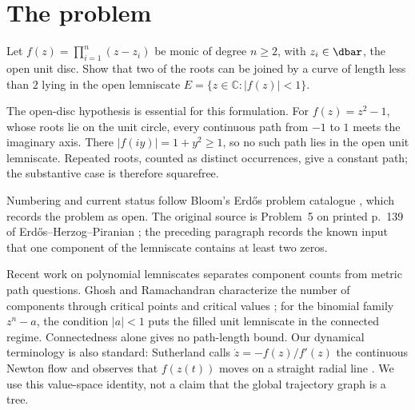 \section{The problem}\label{sec:problem}

\begin{problem}[Erd\H{o}s \#1041]\label{res:problem}
Let $f(z)=\prod_{i=1}^{n}(z-z_i)$ be monic of degree $n\ge2$, with
$z_i\in\dbar$, the open unit disc.  Show that two of the roots can be joined by a curve of length less than
$2$ lying in the open lemniscate $E=\{z\in\mathbb{C}:|f(z)|<1\}$.
\end{problem}

The open-disc hypothesis is essential for this formulation.  For
$f(z)=z^2-1$, whose roots lie on the unit circle, every continuous path from
$-1$ to $1$ meets the imaginary axis.  There $|f(iy)|=1+y^2\ge1$, so no
such path lies in the open unit lemniscate.  Repeated roots, counted as distinct
occurrences, give a constant path; the substantive case is therefore
squarefree.

\noindent Numbering and current status follow Bloom's Erd\H{o}s problem
catalogue \cite{bloom}, which records the problem as open.
The original source is Problem~5 on printed p.~139 of
Erd\H{o}s--Herzog--Piranian \cite[p.~139]{ehp1958}; the preceding paragraph records the
known input that one component of the lemniscate contains at least two zeros.

Recent work on polynomial lemniscates separates component counts from metric
path questions. Ghosh and Ramachandran characterize the number of components
through critical points and critical values \cite[Lemma~7]{ghosh2023}; for the
binomial family $z^n-a$, the condition $|a|<1$ puts the filled unit lemniscate
in the connected regime. Connectedness alone gives no path-length bound.
Our dynamical terminology is also standard: Sutherland calls
$\dot z=-f(z)/f'(z)$ the continuous Newton flow and observes that $f(z(t))$
moves on a straight radial line \cite[p.~42]{sutherland1992}. We use this
value-space identity, not a claim that the global trajectory graph is a tree.

